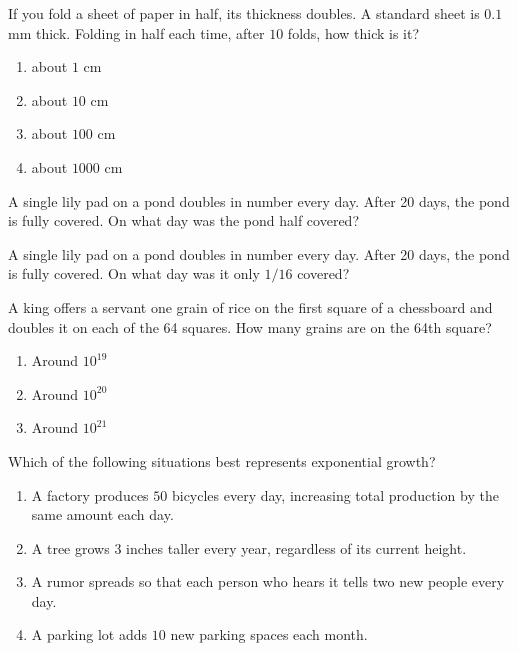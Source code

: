 \documentclass[noauthor]{ximera}
\author{Bart Snapp}
\begin{document}
\maketitle


\begin{exercise}
If you fold a sheet of paper in half, its thickness doubles. A standard sheet is $0.1$ mm thick.
Folding in half each time, after  $10$ folds, how thick is it?
\begin{enumerate}
  \item about $1$ cm
  \item about $10$ cm
  \item about $100$ cm
  \item about $1000$ cm
\end{enumerate}
\end{exercise}

\begin{exercise}
  A single lily pad on a pond doubles in number every day. After 20 days, the pond is fully covered.
  On what day was the pond half covered?
\end{exercise}


\begin{exercise}
  A single lily pad on a pond doubles in number every day. After 20 days, the pond is fully covered.
  On what day was it only $1/16$ covered?
\end{exercise}


\begin{exercise}
  A king offers a servant one grain of rice on the first square of a chessboard and doubles it on each of the 64 squares.
  How many grains are on the 64th square?
  \begin{enumerate}
    \item Around $10^{19}$
    \item Around $10^{20}$ 
    \item Around $10^{21}$ 
  \end{enumerate}
\end{exercise}


\begin{exercise}
Which of the following situations best represents exponential growth?
\begin{enumerate}
\item A factory produces $50$ bicycles every day, increasing total production by the same amount each day.
\item A tree grows $3$ inches taller every year, regardless of its current height.
\item A rumor spreads so that each person who hears it tells two new people every day.
\item A parking lot adds $10$ new parking spaces each month.
\end{enumerate}
\end{exercise}

\end{document}
